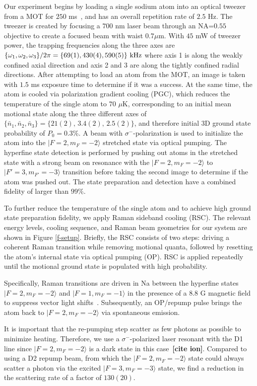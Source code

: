 \documentclass[aps,prl,twocolumn,groupedaddress]{revtex4-1}
\newcommand{\fxnote}[1]{{\textbf{[#1]}}}
\begin{document}
Our experiment begins by loading a single sodium atom into an optical tweezer from a MOT
for $250$ ms~\cite{Hutzler2017-LightShifts}, and has an overall repetition rate of $2.5$ Hz.
The tweezer is created by focusing a $700$ nm laser beam through an NA=$0.55$ objective to
create a focused beam with waist $0.7 \mu$m.
With $45$ mW of tweezer power, the trapping frequencies along the three axes are
$\{\omega_1,\omega_2,\omega_3\}/2\pi = \{69(1), 430(4), 590(5)\}\ \text{\text{kHz}}$
where axis 1 is along the weakly confined axial direction and axis 2 and 3 are along the
tightly confined radial directions.
After attempting to load an atom from the MOT, an image is taken with $1.5$ ms exposure time to determine if it was a success.
At the same time, the atom is cooled via polarization gradient cooling (PGC),
which reduces the temperature of the single atom to $70$ $\mu$K,
corresponding to an initial mean motional state along the three different axes of
$\{\bar n_1, \bar n_2, \bar n_3\}=\{21(2),\, 3.4(2),\, 2.5(2)\}$, and therefore initial 3D ground state probability of $P_0=0.3$\%.
A beam with $\sigma^-$-polarization is used to initialize the atom into
the $|F=2, m_F=-2\rangle$ stretched state via optical pumping.
The hyperfine state detection is performed by pushing out atoms in the stretched state with a strong
beam on resonance with the $|F=2, m_F=-2\rangle$ to $|F'=3, m_{F'}=-3\rangle$ transition before
taking the second image to determine if the atom was pushed out.
The state preparation and detection have a combined fidelity of larger than $99$\%.

To further reduce the temperature of the single atom and
to achieve high ground state preparation fidelity, we apply Raman sideband cooling (RSC).
The relevant energy levels, cooling sequence, and Raman beam geometries for our system
are shown in Figure \ref{f-setup}. Briefly, the RSC consists of two steps:
driving a coherent Raman transition while removing motional quanta, followed by resetting the atom's internal state via optical pumping (OP).
RSC is applied repeatedly until the motional ground state is populated with high probability.

Specifically, Raman transitions are driven in Na between the hyperfine states
$|F=2, m_F=-2\rangle$ and $|F=1, m_F=-1\rangle$ in the presence of a $8.8$ G magnetic field to suppress vector light shifts~\cite{Kaufman2012,Thompson2013}.
Subsequently, an OP/repump pulse brings the atom back to $|F=2, m_F=-2\rangle$
via spontaneous emission.

It is important that the re-pumping step scatter as few photons as possible to minimize heating.
Therefore, we use a $\sigma^-$-polarized laser resonant with the D1 line
since $|F=2, m_F=-2\rangle$ is a dark state in this case~\cite{Grobner2017}\fxnote{cite ion}.
Compared to using a D2 repump beam, from which the $|F=2, m_F=-2\rangle$ state
could always scatter a photon via the excited $|F=3, m_F=-3\rangle$ state,
we find a reduction in the scattering rate of a factor of $130(20)$.
\end{document}
